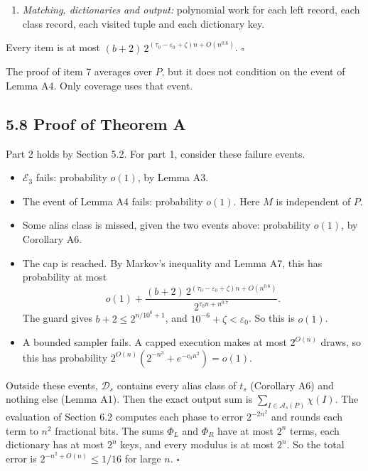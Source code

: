 \documentclass[10pt,a4paper]{article}
\begin{document}
\begin{enumerate}
happens for at most one residue $j'$. By (F4), $\Pr_P[P \mid D] \le \mathrm{poly}(n)(b+\log n)2^{-\eta n}$, as
$|D| < 2^{b + O(\log n)}$. By Lemma A2, at most $(n+1)^2$ key pairs share the values $x_L$ and $x_R$. Hence one
trial visits in expectation at most
\[\mathrm{poly}(n)\,(b + \log n)\,2^{|L| - d(L) + |R| - d(R)}\binom mk\binom m{\sigma-k}2^{-\eta n - \gamma m}\]
tuples. With Lemma A3(3) and $d(R) \ge 0$, the total over all trials is
\[(b + \log n)\,2^{(1 - \mu + (h(a) + h(1/2-a) - \gamma)\mu - \eta)n + O(n^{0.6})}.\]
By (C4) the exponent is below $(\tau_0 - \varepsilon_0)n$.
\item \emph{Matching, dictionaries and output:} polynomial work for each left record, each class record, each visited tuple
and each dictionary key.
\end{enumerate}

Every item is at most $(b+2)\,2^{(\tau_0 - \varepsilon_0 + \zeta)n + O(n^{0.6})}$. $\square$

The proof of item 7 averages over $P$, but it does not condition on the event of Lemma A4. Only coverage uses that event.

\subsection*{5.8 Proof of Theorem A}

Part 2 holds by Section 5.2. For part 1, consider these failure events.

\begin{itemize}
\item $\mathcal E_3$ fails: probability $o(1)$, by Lemma A3.
\item The event of Lemma A4 fails: probability $o(1)$. Here $M$ is independent of $P$.
\item Some alias class is missed, given the two events above: probability $o(1)$, by Corollary A6.
\item The cap is reached. By Markov's inequality and Lemma A7, this has probability at most
\[o(1) + \frac{(b+2)\,2^{(\tau_0 - \varepsilon_0 + \zeta)n + O(n^{0.6})}}{2^{\tau_0 n + n^{0.7}}}.\]
The guard gives $b + 2 \le 2^{n/10^6 + 1}$, and $10^{-6} + \zeta < \varepsilon_0$. So this is $o(1)$.
\item A bounded sampler fails. A capped execution makes at most $2^{O(n)}$ draws, so this has probability
$2^{O(n)}(2^{-n^3} + e^{-c_0n^2}) = o(1)$.
\end{itemize}

Outside these events, $\mathcal D_s$ contains every alias class of $t_s$ (Corollary A6) and nothing else (Lemma A1). Then
the exact output sum is $\sum_{I\in\mathcal A_s(P)}\chi(I)$. The evaluation of Section 6.2 computes each phase to error
$2^{-2n^2}$ and rounds each term to $n^2$ fractional bits. The sums $\Phi_L$ and $\Phi_R$ have at most $2^n$ terms, each
dictionary has at most $2^n$ keys, and every modulus is at most $2^n$. So the total error is $2^{-n^2 + O(n)} \le 1/16$
for large $n$. $\square$
\end{document}
